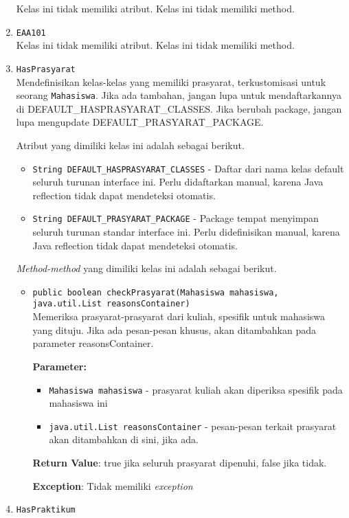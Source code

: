\documentclass{article}
\begin{document}
\begin{enumerate}
Kelas ini tidak memiliki atribut. Kelas ini tidak memiliki method. \item \texttt{EAA101}\\ 


Kelas ini tidak memiliki atribut. Kelas ini tidak memiliki method. \item \texttt{HasPrasyarat}\\ 
Mendefinisikan kelas-kelas yang memiliki prasyarat, terkustomisasi
 untuk seorang \texttt{Mahasiswa}. Jika ada tambahan, jangan lupa untuk
 mendaftarkannya di DEFAULT\_HASPRASYARAT\_CLASSES. Jika berubah package,
 jangan lupa mengupdate DEFAULT\_PRASYARAT\_PACKAGE.

Atribut yang dimiliki kelas ini adalah sebagai berikut.
\begin{itemize}
\item \texttt{String DEFAULT\_HASPRASYARAT\_CLASSES} - Daftar dari nama kelas default seluruh turunan interface ini. Perlu didaftarkan
 manual, karena Java reflection tidak dapat mendeteksi otomatis.
\item \texttt{String DEFAULT\_PRASYARAT\_PACKAGE} - Package tempat menyimpan seluruh turunan standar interface ini. Perlu didefinisikan
 manual, karena Java reflection tidak dapat mendeteksi otomatis.
\end{itemize}
\textit{Method-method} yang dimiliki kelas ini adalah sebagai berikut.
\begin{itemize}
\item \texttt{public boolean checkPrasyarat(Mahasiswa mahasiswa, java.util.List reasonsContainer)}\\ 
Memeriksa prasyarat-prasyarat dari kuliah, spesifik untuk mahasiswa
 yang dituju. Jika ada pesan-pesan khusus, akan ditambahkan pada parameter
 reasonsContainer.

\textbf{Parameter:}
\begin{itemize}
\item \texttt{Mahasiswa mahasiswa} - 
prasyarat kuliah akan diperiksa spesifik pada mahasiswa ini
\item \texttt{java.util.List reasonsContainer} - 
pesan-pesan terkait prasyarat akan ditambahkan di sini, jika ada.
\end{itemize}
\textbf{Return Value}: true jika seluruh prasyarat dipenuhi, false jika tidak.

\textbf{Exception}: Tidak memiliki \textit{exception}

\end{itemize}
\item \texttt{HasPraktikum}\\ 



\end{enumerate}
\end{document}
